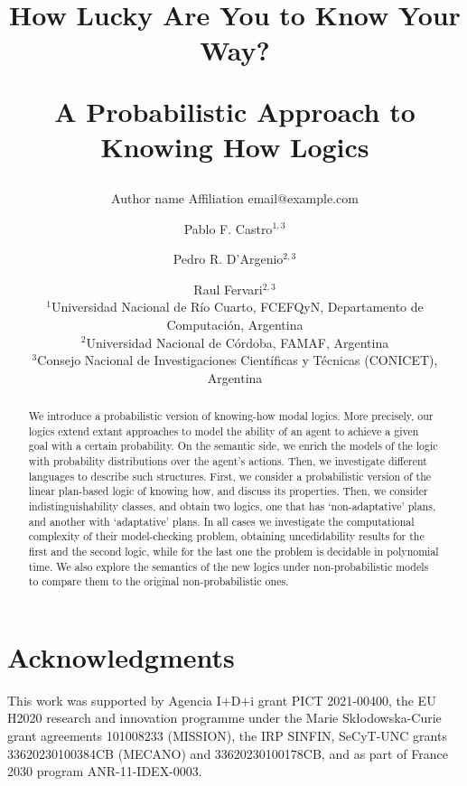 \documentclass{article}
\title{How Lucky Are You to Know Your Way?\par A Probabilistic Approach to Knowing How Logics}   %
\author{%
    Author name
    \affiliations
    Affiliation
    \emails
    email@example.com    %
}
\author{%
Pablo F. Castro$^{1,3}$\and
Pedro R. D'Argenio$^{2,3}$\and
Raul Fervari$^{2,3}$ \\
\affiliations
$^1$Universidad Nacional de R\'io Cuarto, FCEFQyN, Departamento de Computaci\'on, Argentina\\
$^2$Universidad Nacional de C\'ordoba, FAMAF, Argentina\\
$^3$Consejo Nacional de Investigaciones Cient\'ificas y T\'ecnicas (CONICET), Argentina\\
}
\begin{document}
\maketitle

\begin{abstract}
  We introduce a probabilistic version of knowing-how modal logics.  More precisely,  our logics extend extant approaches to model the ability of an agent to achieve a given goal with a certain probability.  On the semantic side,  we enrich the models of the logic with probability distributions over the agent's actions.  Then, we investigate different languages to describe such structures.  First,  we consider a probabilistic version of the linear plan-based logic of knowing how, and discuss its properties. Then, we consider indistinguishability classes,  and obtain two logics,  one that has `non-adaptative' plans, and another  with `adaptative' plans. In all cases we investigate the computational complexity of their model-checking problem, obtaining uncedidability results for the first and the second logic, while for the last one the problem is decidable in polynomial time. We also explore the semantics of the new logics under non-probabilistic models to compare them to the original non-probabilistic ones.
\end{abstract}







\section*{Acknowledgments}

This work was supported by Agencia I$+$D$+$i grant PICT 2021-00400,
%
the EU H2020 research and innovation programme
under the Marie Sk{\l}odowska-Curie grant agreements 101008233
({\scriptsize MISSION}),
%
the IRP SINFIN, 
%
SeCyT-UNC grants 33620230100384CB ({\scriptsize MECANO}) and 33620230100178CB,
and as part of France 2030 program ANR-11-IDEX-0003.
%











% 
\end{document}

